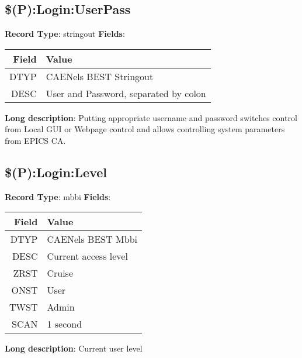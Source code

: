 \subsection{\$(P):Login:UserPass}
\textbf{Record Type}: stringout \newline \newline 
\textbf{Fields}: \newline 
\begin{tabularx}{0.7\linewidth}{|r|X|}
\hline Field & Value \\
\hline
\hline
DTYP & CAENels BEST Stringout\\
\hline
DESC & User and Password, separated by colon\\
\hline
\end{tabularx}
\newline \newline \newline
\textbf{Long description}: \newline 
 Putting appropriate username and password switches control from Local GUI or Webpage control and allows controlling system parameters from EPICS CA.
\newline \newline


\subsection{\$(P):Login:Level}
\textbf{Record Type}: mbbi \newline \newline 
\textbf{Fields}: \newline 
\begin{tabularx}{0.7\linewidth}{|r|X|}
\hline Field & Value \\
\hline
\hline
DTYP & CAENels BEST Mbbi\\
\hline
DESC & Current access level\\
\hline
ZRST & Cruise\\
\hline
ONST & User\\
\hline
TWST & Admin\\
\hline
SCAN & 1 second\\
\hline
\end{tabularx}
\newline \newline \newline
\textbf{Long description}: \newline 
 Current user level
\newline \newline


